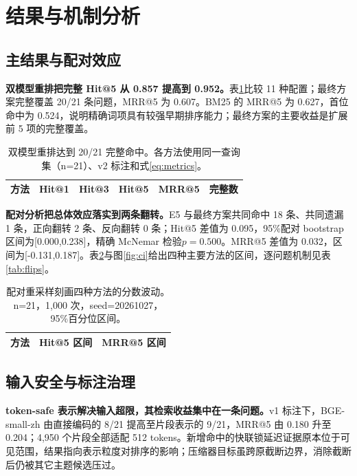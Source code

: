 \section{结果与机制分析}

\subsection{主结果与配对效应}
\textbf{双模型重排把完整 Hit@5 从 0.857 提高到 0.952。}表\ref{tab:main}比较 11 种配置；最终方案完整覆盖 20/21 条问题，MRR@5 为 0.607。BM25 的 MRR@5 为 0.627，首位命中为 0.524，说明精确词项具有较强早期排序能力；最终方案的主要收益是扩展前 5 项的完整覆盖。
\begin{table}[!htbp]\centering\small
\caption{双模型重排达到 20/21 完整命中。各方法使用同一查询集（n=21）、v2 标注和式\eqref{eq:metrics}。}\label{tab:main}
\begin{tabular}{lrrrrr}\toprule 方法 & Hit@1 & Hit@3 & Hit@5 & MRR@5 & 完整数\\\midrule

\end{tabular}
\end{table}

\textbf{配对分析把总体效应落实到两条翻转。}E5 与最终方案共同命中 18 条、共同遗漏 1 条，正向翻转 2 条、反向翻转 0 条；Hit@5 差值为 0.095，95\%配对 bootstrap 区间为[0.000,0.238]，精确 McNemar 检验\(p=0.500\)。MRR@5 差值为 0.032，区间为[-0.131,0.187]。表\ref{tab:ci}与图\ref{fig:ci}给出四种主要方法的区间，逐问题机制见表\ref{tab:flips}。
\begin{table}[!htbp]\centering\small
\caption{配对重采样刻画四种方法的分数波动。n=21，1,000 次，seed=20261027，95\%百分位区间。}\label{tab:ci}
\begin{tabular}{lcc}\toprule 方法 & Hit@5 区间 & MRR@5 区间\\\midrule

\end{tabular}
\end{table}


\subsection{输入安全与标注治理}
\textbf{token-safe 表示解决输入超限，其检索收益集中在一条问题。}v1 标注下，BGE-small-zh 由直接编码的 8/21 提高至片段表示的 9/21，MRR@5 由 0.180 升至 0.204；4,950 个片段全部适配 512 tokens。新增命中的快联锁延迟证据原本位于可见范围，结果指向表示粒度对排序的影响；压缩器目标虽跨原截断边界，消除截断后仍被其它主题候选压过。

